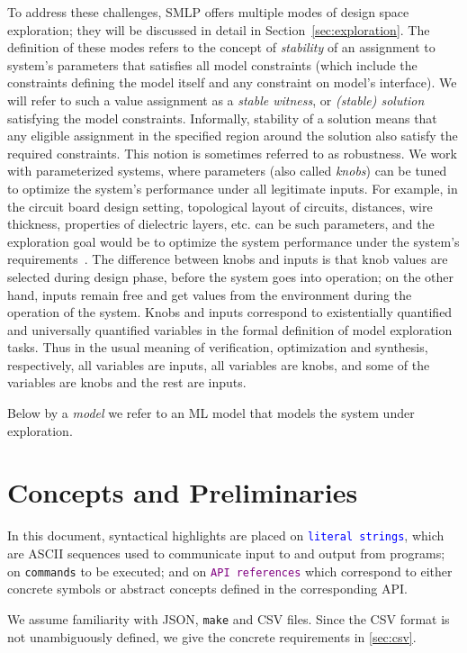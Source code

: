 \documentclass[a4paper,parskip=half]{article} %
\newcommand*\cmdstyle\texttt
\newcommand*\literalColor{blue}
\newcommand*\cmd[1]{\cmdstyle{\textcolor{red!85!black}{#1}}}
\newcommand*\literal[1]{\textcolor{\literalColor}{\cmdstyle{#1}}}
\newcommand*\api[1]{\textcolor{purple}{\cmdstyle{#1}}}
\begin{document}
To address these challenges, SMLP offers multiple modes of design space exploration; they will be discussed in detail in Section~\ref{sec:exploration}.
The definition of these modes refers to the concept of \emph{stability} of an assignment to system's parameters that satisfies all model constraints 
(which include the constraints defining the model itself and any constraint on model's interface).
We will refer to such a value assignment as a \emph{stable witness}, or \emph{(stable) solution} satisfying the model constraints. 
Informally, stability of a solution means that any eligible assignment in the specified region around the solution also satisfy the required constraints.
This notion is sometimes referred to as robustness. We work with parameterized systems, where parameters (also called \emph{knobs}) can 
be tuned to optimize the system's performance under all legitimate inputs.
For example, in the circuit board design setting, topological layout of circuits, distances, wire thickness, properties of dielectric layers, etc.
can be such parameters, and the exploration goal would be to optimize the system performance under the system's requirements~\cite{9501615}.
The difference between knobs and inputs is that knob values are selected during design phase, before the system goes into operation; on the other hand, 
inputs remain free and get values from the environment during the operation of the system. Knobs and inputs correspond to existentially quantified 
and universally quantified variables in the formal definition of model exploration tasks. Thus in the usual meaning of verification, optimization and synthesis, 
respectively, all variables are inputs, all variables are knobs, and some of the variables are knobs and the rest are inputs.


Below by a \emph{model} we refer to an ML model that models the system under exploration.


\section{Concepts and Preliminaries}
In this document, syntactical highlights are placed on
\literal{literal strings}, which are ASCII sequences used to communicate input
to and output from programs; on \cmd{commands} to be executed;
and on \api{API references} which correspond to
either concrete symbols or abstract concepts defined in the corresponding API.

We assume familiarity with JSON, \cmd{make} and CSV files. Since the CSV format
is not unambiguously defined, we give the concrete requirements in
\cref{sec:csv}.
\end{document}
